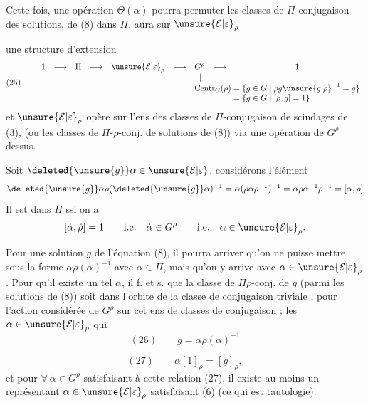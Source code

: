 Cette fois, une opération $\Theta(\alpha)$ pourra permuter les classes de $\Pi$-conjugaison des  solutions, de (8) dans $\Pi$.
  aura sur $\unsure{\mathcal E|\varepsilon}_\rho$


une structure d'extension
\[
(25)\qquad
\begin{array}{ccccccccc}
1&\longrightarrow&\Pi&\longrightarrow&\unsure{\mathcal E|\varepsilon}_\rho&\longrightarrow&G^\rho&\longrightarrow&1\\
&&&&&&\Vert\\
&&&&&&\multicolumn{3}{l}{\operatorname{Centr}_G(\rho)=\{g\in G\mid\rho g\unsure{g|\rho}^{-1}=g\}}\\
&&&&&&\multicolumn{3}{l}{\phantom{\operatorname{Centr}_G(\rho)}=\{g\in G\mid[\rho,g]=1\}}
\end{array}
\]
et $\unsure{\mathcal E|\varepsilon}_\rho$ opère sur l'ens des classes de $\Pi$-conjugaison de scindages de (3), (ou les classes de $\Pi$-$\rho$-conj. de solutions de (8)) via une opération de $G^\rho$ dessus.

Soit $\deleted{\unsure{g}}\alpha\in\unsure{\mathcal E|\varepsilon}$, considérons l'élément
\[
\deleted{\unsure{g}}\alpha\rho(\deleted{\unsure{g}}\alpha)^{-1}
=\alpha(\rho\alpha\rho^{-1})^{-1}
=\alpha\rho\alpha^{-1}\rho^{-1}=[\alpha,\rho]
\]
Il est dans $\Pi$ ssi on a 
\[
[\dot\alpha,\dot\rho]=1\qquad\text{i.e.}\quad
\dot\alpha\in G^\rho\qquad\text{i.e.}\quad\alpha\in\unsure{\mathcal E|\varepsilon}_\rho.
\]

Pour une solution $g$ de l'équation (8), il pourra arriver qu'on ne puisse  mettre sous la forme  $\alpha\rho(\alpha)^{-1}$ avec $\alpha\in\Pi$, mais qu'on y arrive avec $\alpha\in\unsure{\mathcal E|\varepsilon}_\rho$.
Pour qu'il existe un tel $\alpha$, il f. et s. que la classe de $\Pi\rho$-conj. \inserted{$[g]_\rho$} de $g$ (parmi les solutions de (8)) soit dans l'orbite de la classe de conjugaison triviale \inserted{$[1]_\rho$}, pour l'action considérée de $G^\rho$ sur cet ens de classes de conjugaison ;  les $\alpha\in\unsure{\mathcal E|\varepsilon}_\rho$ qui 
\[
(26)\qquad g=\alpha\rho(\alpha)^{-1}
\]


\[
(27)\qquad\dot\alpha[1]_\rho=[g]_\rho,
\]
et pour $\forall\ \dot\alpha\in G^\rho$ satisfaisant à cette relation (27), il existe au moins un représentant $\alpha\in\unsure{\mathcal E|\varepsilon}_\rho$ satisfaisant (6) (ce qui est  tautologie).

